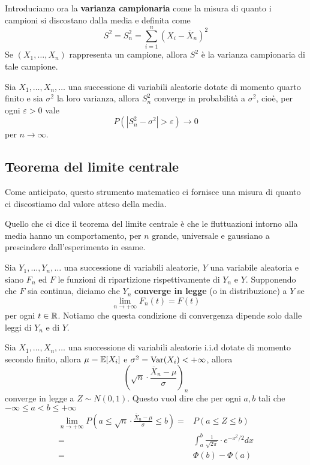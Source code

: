 Introduciamo ora la \textbf{varianza campionaria} come la misura di quanto i campioni si
discostano dalla media e definita come
\[ S^2 = S_n^2 = \sum_{i=1}^n \left( X_i - \overline{X}_n \right)^2 \]
Se $(X_1, \dots, X_n)$ rappresenta un campione, allora $S^2$ è la varianza campionaria di tale
campione.

\begin{proposition}
	Sia $X_1, \dots, X_n, \dots$ una successione di variabili aleatorie dotate di momento quarto
	finito e sia $\sigma^2$ la loro varianza, allora $S_n^2$ converge in probabilità a $\sigma^2$,
	cioè, per ogni $\varepsilon > 0$ vale
	\[ P(|S_n^2 - \sigma^2| > \varepsilon) \to 0 \]
	per $n \to \infty$.
\end{proposition}

\subsection{Teorema del limite centrale}
Come anticipato, questo strumento matematico ci fornisce una misura di quanto ci discostiamo dal
valore atteso della media.

Quello che ci dice il teorema del limite centrale è che le fluttuazioni intorno alla media
hanno un comportamento, per $n$ grande, universale e gaussiano a prescindere dall'esperimento in
esame.

\begin{definition}
	Sia $Y_1, \dots, Y_n, \dots$ una successione di variabili aleatorie, $Y$ una variabile
	aleatoria e siano $F_n$ ed $F$ le funzioni di ripartizione rispettivamente di $Y_n$ e $Y$.
	Supponendo che $F$ sia continua, diciamo che $Y_n$ \textbf{converge in legge} (o in
	distribuzione) a $Y$ se
	\[ \lim_{n \to +\infty} F_n (t) = F(t) \]
	per ogni $t \in \mathbb{R}$. Notiamo che questa condizione di convergenza dipende solo dalle leggi di
	$Y_n$ e di $Y$.
\end{definition}

\begin{theorem}\label{th: tlc}
	Sia $X_1, \dots, X_n, \dots$ una successione di variabili aleatorie i.i.d dotate di momento
	secondo finito, allora $\mu = \mathbb{E}[X_i]$ e $\sigma^2 = \operatorname{Var}(X_i) < +\infty$, allora
	\[ \left( \sqrt{n} \cdot \frac{\overline{X}_n - \mu}{\sigma} \right)_n \]
	converge in legge a $Z \sim N(0,1)$. Questo vuol dire che per ogni $a, b$ tali che
	$-\infty \leq a < b \leq +\infty$
	\begin{align*}
		\lim_{n \to +\infty} P\left( a \leq \sqrt{n} \cdot \frac{\overline{X}_n - \mu}{\sigma}
		\leq b \right) = & P(a \leq Z \leq b)                                      \\
		=                & \int_{a}^{b} \frac{1}{\sqrt{2 \pi}} \cdot e^{-x^2/2} dx \\
		=                & \Phi(b) - \Phi(a)
	\end{align*}
\end{theorem}

